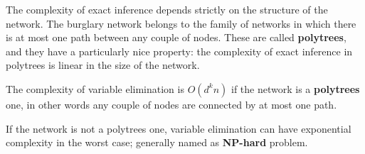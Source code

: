 The complexity of exact inference depends strictly on the structure of the network. The burglary network belongs to the family of networks in which there is at most one path
between any couple of nodes. These are called \textbf{polytrees}, and they have a particularly nice property: the complexity of exact inference in polytrees is linear in the size
of the network.
\begin{definition}[title={Theorem}]
    The complexity of variable elimination is $O(d^kn)$ if the network is a \textbf{polytrees} one, in other words any couple of nodes are connected by at most one path.
\end{definition}
If the network is not a polytrees one, variable elimination can have exponential complexity in the worst case; generally named as \textbf{NP-hard} problem.